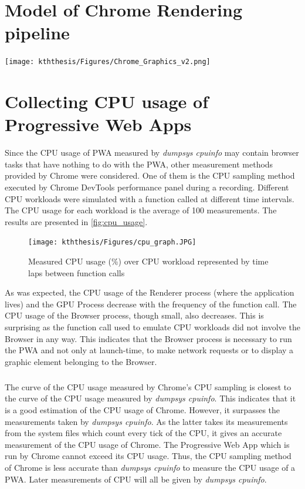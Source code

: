 \documentclass{kththesis}
\begin{document}

\listoffigures
\printbibliography[heading=bibintoc]

\appendix
    \chapter{Model of Chrome Rendering pipeline}
    \label{annex:chrome_model}
    
    \begin{center}
        \texttt{[image: kththesis/Figures/Chrome\_Graphics\_v2.png]}
    \end{center}
    
    \chapter{Collecting CPU usage of Progressive Web Apps}
    \label{annex:cpu_tools}
Since the CPU usage of PWA measured by \textit{dumpsys cpuinfo} may contain browser tasks that have nothing to do with the PWA, other measurement methods provided by Chrome were considered. One of them is the CPU sampling method executed by Chrome DevTools performance panel during a recording. 
Different CPU workloads were simulated with a function called at different time intervals. The CPU usage for each workload is the average of 100 measurements. The results are presented in \autoref{fig:cpu_usage}.

\begin{figure}[h]
    \centering
    \texttt{[image: kththesis/Figures/cpu\_graph.JPG]}
    \caption[Measurements of CPU Usage of PWA]{Measured CPU usage (\%) over CPU workload represented by time laps between function calls}
    \label{fig:cpu_usage}
\end{figure}

As was expected, the CPU usage of the Renderer process (where the application lives) and the GPU Process decrease with the frequency of the function call. The CPU usage of the Browser process, though small, also decreases. This is surprising as the function call used to emulate CPU workloads did not involve the Browser in any way. This indicates that the Browser process is necessary to run the PWA and not only at launch-time, to make network requests or to display a graphic element belonging to the Browser.

\paragraph{}
The curve of the CPU usage measured by Chrome's CPU sampling is closest to the curve of the CPU usage measured by \textit{dumpsys cpuinfo}. This indicates that it is a good estimation of the CPU usage of Chrome. However, it surpasses the measurements taken by \textit{dumpsys cpuinfo}. As the latter takes its measurements from the system files which count every tick of the CPU, it gives an accurate measurement of the CPU usage of Chrome. The Progressive Web App which is run by Chrome cannot exceed its CPU usage. Thus, the CPU sampling method of Chrome is less accurate than \textit{dumpsys cpuinfo} to measure the CPU usage of a PWA. Later measurements of CPU will all be given by \textit{dumpsys cpuinfo}.
\end{document}

